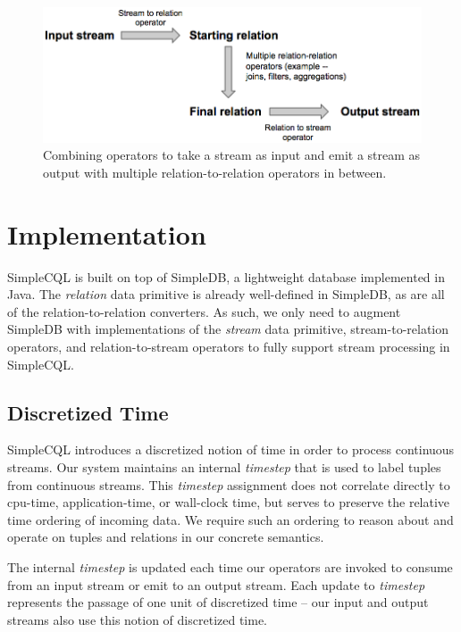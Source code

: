 \documentclass[a4paper, 10pt, conference]{IEEEconf}
\begin{document}
\begin{figure}[h!]
    \centering
    \centerline{\includegraphics[totalheight=2.5cm]{operators.png}}
    \caption{Combining operators to take a stream as input and emit a stream as output with multiple relation-to-relation operators in between.}
    \label{fig:operators}
\end{figure}


\section{Implementation}
SimpleCQL is built on top of SimpleDB, a lightweight database implemented in Java. The \textit{relation} data primitive is already well-defined in SimpleDB, as are all of the relation-to-relation converters. As such, we only need to augment SimpleDB with implementations of the \textit{stream} data primitive, stream-to-relation operators, and relation-to-stream operators to fully support stream processing in SimpleCQL. 

\subsection{Discretized Time}
SimpleCQL introduces a discretized notion of time in order to process continuous streams. Our system maintains an internal \textit{timestep} that is used to label tuples from continuous streams. This \textit{timestep} assignment does not correlate directly to cpu-time, application-time, or wall-clock time, but serves to preserve the relative time ordering of incoming data. We require such an ordering to reason about and operate on tuples and relations in our concrete semantics.

The internal \textit{timestep} is updated each time our operators are invoked to consume from an input stream or emit to an output stream. Each update to \textit{timestep} represents the passage of one unit of discretized time -- our input and output streams also use this notion of discretized time. 
\end{document}
